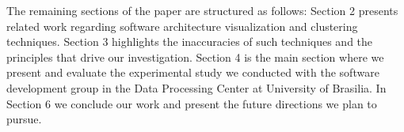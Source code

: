 

The remaining sections of the paper are structured as follows: Section 2 presents related work regarding software architecture visualization and clustering techniques. Section 3 highlights the inaccuracies of such techniques and the principles that drive our investigation. Section 4 is the main section where we present and evaluate the experimental study we conducted with the software development group in the Data Processing Center at University of Brasilia. In Section 6 we conclude our work and present the future directions we plan to pursue.

